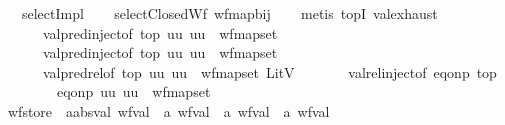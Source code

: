 \begin{isabellebody}
\ \ \ selectImpl\isanewline
%
\isadelimproof
\ \ %
\endisadelimproof
%
\isatagproof
{}\isamarkupfalse%
\ selectClosedWf\ wf{\isacharunderscore}{\kern0pt}map{\isacharunderscore}{\kern0pt}bij\isanewline
\ \ \isamarkupfalse%
\ {\isacharparenleft}{\kern0pt}metis\ top{}I\ val{\isachardot}{\kern0pt}exhaust\isanewline
\ \ \ \ \ \ val{\isachardot}{\kern0pt}pred{\isacharunderscore}{\kern0pt}inject{\isacharparenleft}{\kern0pt}{}{\isacharparenright}{\kern0pt}{\isacharbrackleft}{\kern0pt}of\ top\ {\isachardoublequoteopen}{\isasymlambda}uu{\isachardot}{\kern0pt}\ uu\ {\isasymin}\ wf{\isacharunderscore}{\kern0pt}map{\isacharunderscore}{\kern0pt}set{\isachardoublequoteclose}{\isacharbrackright}{\kern0pt}\isanewline
\ \ \ \ \ \ val{\isachardot}{\kern0pt}pred{\isacharunderscore}{\kern0pt}inject{\isacharparenleft}{\kern0pt}{}{\isacharparenright}{\kern0pt}{\isacharbrackleft}{\kern0pt}of\ top\ {\isachardoublequoteopen}{\isasymlambda}uu{\isachardot}{\kern0pt}\ uu\ {\isasymin}\ wf{\isacharunderscore}{\kern0pt}map{\isacharunderscore}{\kern0pt}set{\isachardoublequoteclose}{\isacharbrackright}{\kern0pt}\isanewline
\ \ \ \ \ \ val{\isachardot}{\kern0pt}pred{\isacharunderscore}{\kern0pt}rel{\isacharbrackleft}{\kern0pt}of\ top\ {\isachardoublequoteopen}{\isasymlambda}uu{\isachardot}{\kern0pt}\ uu\ {\isasymin}\ wf{\isacharunderscore}{\kern0pt}map{\isacharunderscore}{\kern0pt}set{\isachardoublequoteclose}\ {\isachardoublequoteopen}LitV\ {\isacharunderscore}{\kern0pt}{\isachardoublequoteclose}{\isacharbrackright}{\kern0pt}\isanewline
\ \ \ \ \ \ val{\isachardot}{\kern0pt}rel{\isacharunderscore}{\kern0pt}inject{\isacharparenleft}{\kern0pt}{}{\isacharparenright}{\kern0pt}{\isacharbrackleft}{\kern0pt}of\ {\isachardoublequoteopen}eq{\isacharunderscore}{\kern0pt}onp\ top{\isachardoublequoteclose}\isanewline
\ \ \ \ \ \ \ \ {\isachardoublequoteopen}eq{\isacharunderscore}{\kern0pt}onp\ {\isacharparenleft}{\kern0pt}{\isasymlambda}uu{\isachardot}{\kern0pt}\ uu\ {\isasymin}\ wf{\isacharunderscore}{\kern0pt}map{\isacharunderscore}{\kern0pt}set{\isacharparenright}{\kern0pt}{\isachardoublequoteclose}{\isacharbrackright}{\kern0pt}{\isacharparenright}{\kern0pt}%
\endisatagproof
{\isafoldproof}%
%
\isadelimproof
\isanewline
%
\endisadelimproof
\isanewline
{}\isamarkupfalse%
\ wf{\isacharunderscore}{\kern0pt}store\ {\isacharcolon}{\kern0pt}{\isacharcolon}{\kern0pt}\ {\isachardoublequoteopen}{\isacharprime}{\kern0pt}a{\isacharcolon}{\kern0pt}{\isacharcolon}{\kern0pt}absval\ wf{\isacharunderscore}{\kern0pt}val\ {\isasymRightarrow}\ {\isacharprime}{\kern0pt}a\ wf{\isacharunderscore}{\kern0pt}val\ {\isasymRightarrow}\ {\isacharprime}{\kern0pt}a\ wf{\isacharunderscore}{\kern0pt}val\ {\isasymRightarrow}\ {\isacharprime}{\kern0pt}a\ wf{\isacharunderscore}{\kern0pt}val{\isachardoublequoteclose}\isanewline

\end{isabellebody}
